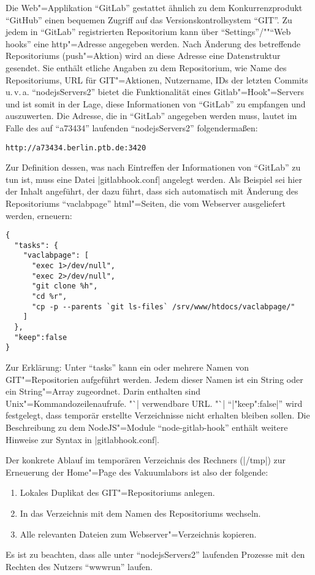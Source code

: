\documentclass[%
fontsize=11pt
,paper=a4
,twoside
,headings=normal
,numbers=endperiod
,pagesize
]{scrartcl}
\begin{document}
Die Web"=Applikation "`GitLab"' gestattet ähnlich zu dem Konkurrenzprodukt
"`GitHub"' einen bequemen Zugriff auf das Versionskontrollsystem "`GIT"'. Zu
jedem  in "`GitLab"' registrierten Repositorium kann über
"`Settings"'/"""`Web hooks"' eine http"=Adresse angegeben werden. Nach
Änderung des betreffende Repositoriums (push"=Aktion) wird an diese Adresse
eine Datenstruktur gesendet. Sie enthält etliche Angaben zu dem
Repositorium, wie Name des Repositoriums, URL für GIT"=Aktionen, Nutzername,
IDs der letzten Commits u.\,v.\,a. "`nodejsServers2"' bietet die
Funktionalität eines Gitlab"=Hook"=Servers und ist somit in der Lage, diese
Informationen von "`GitLab"' zu empfangen und auszuwerten. Die Adresse, die
in "`GitLab"' angegeben werden muss, lautet im Falle des auf "`a73434"'
laufenden "`nodejsServers2"' folgendermaßen:
\begin{lstlisting}[language={}]
  http://a73434.berlin.ptb.de:3420
\end{lstlisting}
Zur Definition dessen, was nach Eintreffen der
Informationen von "`GitLab"' zu tun ist, muss eine Datei |gitlabhook.conf|
angelegt werden. Als Beispiel sei hier der Inhalt angeführt, der dazu führt,
dass sich automatisch mit Änderung des Repositoriums "`vaclabpage"'
html"=Seiten, die vom Webserver ausgeliefert werden, erneuern:
\begin{lstlisting}[language={}]
{
  "tasks": {
    "vaclabpage": [
      "exec 1>/dev/null",
      "exec 2>/dev/null",
      "git clone %h",
      "cd %r",
      "cp -p --parents `git ls-files` /srv/www/htdocs/vaclabpage/"
    ]
  },
  "keep":false
}
\end{lstlisting}
Zur Erklärung: Unter "`tasks"' kann ein oder mehrere Namen von
GIT"=Repositorien aufgeführt werden. Jedem dieser Namen ist ein String oder
ein String"=Array zugeordnet. Darin enthalten sind Unix"=Kommandozeilenaufrufe.
"`|%
verwendbare URL. "`|%
"`|"keep":false|"' wird festgelegt, dass temporär erstellte Verzeichnisse nicht
erhalten bleiben sollen. Die Beschreibung zu dem NodeJS"=Module
"`node-gitlab-hook"' enthält weitere Hinweise zur Syntax in |gitlabhook.conf|.

Der konkrete Ablauf im temporären Verzeichnis des Rechners
(|/tmp|) zur Erneuerung der Home"=Page des Vakuumlabors ist also der
folgende:
\begin{enumerate}
  \item Lokales Duplikat des GIT"=Repositoriums anlegen.
  \item In das Verzeichnis mit dem Namen des Repositoriums wechseln.
  \item Alle relevanten Dateien zum Webserver"=Verzeichnis kopieren.
\end{enumerate}
Es ist zu beachten, dass alle unter "`nodejsServers2"' laufenden Prozesse
mit den Rechten des Nutzers "`wwwrun"' laufen.
\end{document}
